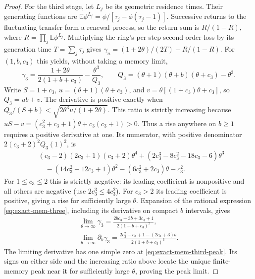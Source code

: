 \begin{proof}
For the third stage, let $L_j$ be its geometric residence times.
Their generating functions are
$\mathbb E\phi^{L_j}=\phi/[\tau_j-\phi(\tau_j-1)]$.
Successive returns to the fluctuating transfer form a renewal process,
so the return sum is $R/(1-R)$, where
$R=\prod_j\mathbb E\phi^{L_j}$. Multiplying the ring's per-step
second-order loss by its generation time $T=\sum_j\tau_j$ gives
$\gamma_n=(1+2\theta)/(2T)-R/(1-R)$.
For $(1,b,c_3)$ this yields, without taking a memory limit,
\begin{equation}
 \gamma_3=\frac{1+2\theta}{2(1+b+c_3)}-\frac{\theta^3}{Q_3},\qquad
 Q_3=(\theta+1)(\theta+b)(\theta+c_3)-\theta^3.
 \label{eq:exact-mem-three}
\end{equation}
Write $S=1+c_3$, $u=(\theta+1)(\theta+c_3)$, and
$v=\theta[(1+c_3)\theta+c_3]$, so $Q_3=ub+v$.
The derivative is positive exactly when
$Q_3/(S+b)<\sqrt{2\theta^3u/(1+2\theta)}$.
This ratio is strictly increasing because
$uS-v=(c_3^2+c_3+1)\theta+c_3(c_3+1)>0$.
Thus a rise anywhere on $b\geq1$ requires a positive derivative at one.
Its numerator, with positive denominator $2(c_3+2)^2Q_3(1)^2$, is
\begin{equation}
\begin{split}
 &(c_3-2)(2c_3+1)(c_3+2)\theta^4
 +(2c_3^3-8c_3^2-18c_3-6)\theta^3\\
 &\hspace{1em}-(14c_3^2+12c_3+1)\theta^2
             -(6c_3^2+2c_3)\theta-c_3^2.
 \label{eq:exact-mem-three-boundary}
\end{split}
\end{equation}
For $1\leq c_3\leq2$ this is strictly negative: its leading coefficient
is nonpositive and all others are negative (use $2c_3^3\leq4c_3^2$).
For $c_3>2$ its leading coefficient is positive, giving a rise for
sufficiently large $\theta$.
Expansion of the rational expression \eqref{eq:exact-mem-three},
including its derivative on compact $b$ intervals, gives
\begin{equation}
\begin{gathered}
 \lim_{\theta\to\infty}\gamma_3
 =\frac{2bc_3+3b+3c_3+1}{2(1+b+c_3)^2},\\
 \lim_{\theta\to\infty}\partial_b\gamma_3
 =\frac{2c_3^2-c_3+1-(2c_3+3)b}{2(1+b+c_3)^3}.
 \label{eq:exact-mem-three-limit}
\end{gathered}
\end{equation}
The limiting derivative has one simple zero at
\eqref{eq:exact-mem-third-peak}. Its signs on either side and the
increasing ratio above locate the unique finite-memory peak near it
for sufficiently large $\theta$, proving the peak limit.
\end{proof}

